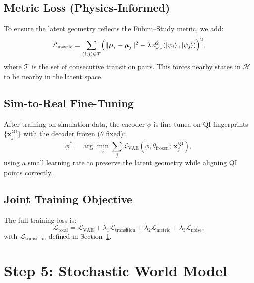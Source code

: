 \documentclass[11pt,a4paper]{article}
\begin{document}
\subsection{Metric Loss (Physics-Informed)}

To ensure the latent geometry reflects the Fubini--Study metric, we add:
\begin{equation}
    \mathcal{L}_{\mathrm{metric}} =
    \sum_{(i,j) \in \mathcal{T}}
    \Bigl(\|\boldsymbol{\mu}_i - \boldsymbol{\mu}_j\|^2
    - \lambda\, d_{\mathrm{FS}}^2(\ket{\psi_i}, \ket{\psi_j})\Bigr)^2,
\end{equation}
where $\mathcal{T}$ is the set of consecutive transition pairs. This forces
nearby states in $\mathcal{H}$ to be nearby in the latent space.

\subsection{Sim-to-Real Fine-Tuning}

After training on simulation data, the encoder $\phi$ is fine-tuned on QI fingerprints
$\{\mathbf{x}_j^{\mathrm{QI}}\}$ with the decoder frozen ($\theta$ fixed):
\begin{equation}
    \phi^* = \arg\min_\phi
    \sum_j \mathcal{L}_{\mathrm{VAE}}(\phi, \theta_{\mathrm{frozen}};\, \mathbf{x}_j^{\mathrm{QI}}),
\end{equation}
using a small learning rate to preserve the latent geometry while aligning QI points correctly.

\subsection{Joint Training Objective}

The full training loss is:
\begin{equation}
    \mathcal{L}_{\mathrm{total}} =
    \mathcal{L}_{\mathrm{VAE}}
    + \lambda_1 \mathcal{L}_{\mathrm{transition}}
    + \lambda_2 \mathcal{L}_{\mathrm{metric}}
    + \lambda_3 \mathcal{L}_{\mathrm{noise}},
\end{equation}
with $\mathcal{L}_{\mathrm{transition}}$ defined in Section~\ref{sec:worldmodel}.

\section{Step 5: Stochastic World Model}\label{sec:worldmodel}
\end{document}
